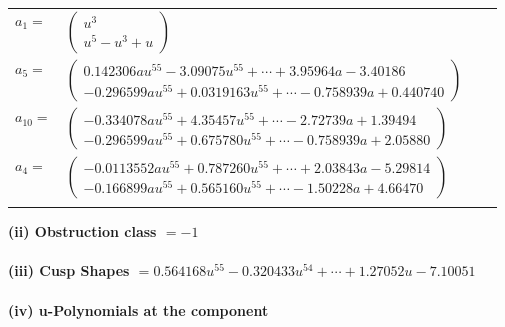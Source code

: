 \documentclass[1p]{elsarticle_modified}
\theoremstyle{definition}
\begin{document}
\begin{tabular}{m{7pt} m{180pt} m{7pt} m{180pt} }
\flushright $a_{1}=$&$\begin{pmatrix}u^3\\u^5- u^3+u\end{pmatrix}$ \\
\flushright $a_{5}=$&$\begin{pmatrix}0.142306 a u^{55}-3.09075 u^{55}+\cdots+3.95964 a-3.40186\\-0.296599 a u^{55}+0.0319163 u^{55}+\cdots-0.758939 a+0.440740\end{pmatrix}$ \\
\flushright $a_{10}=$&$\begin{pmatrix}-0.334078 a u^{55}+4.35457 u^{55}+\cdots-2.72739 a+1.39494\\-0.296599 a u^{55}+0.675780 u^{55}+\cdots-0.758939 a+2.05880\end{pmatrix}$ \\
\flushright $a_{4}=$&$\begin{pmatrix}-0.0113552 a u^{55}+0.787260 u^{55}+\cdots+2.03843 a-5.29814\\-0.166899 a u^{55}+0.565160 u^{55}+\cdots-1.50228 a+4.66470\end{pmatrix}$\\&\end{tabular}
\flushleft \textbf{(ii) Obstruction class $= -1$}\\~\\
\flushleft \textbf{(iii) Cusp Shapes $= 0.564168 u^{55}-0.320433 u^{54}+\cdots+1.27052 u-7.10051$}\\~\\
\newpage\renewcommand{\arraystretch}{1}
\flushleft \textbf{(iv) u-Polynomials at the component}\newline \\
\end{document}
